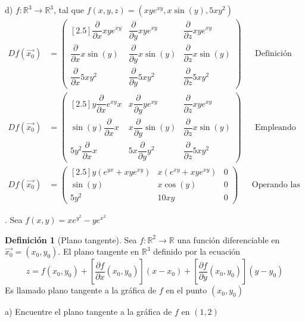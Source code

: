 \documentclass[letterpaper]{article}
\renewcommand{\d}{\partial}
\newcommand{\R}{\mathds{R}}
\renewcommand{\*}{\cdot}
\theoremstyle{definition}
\newtheorem{definition}{Definición}
\begin{document}
\noindent d) $f: \mathbb{R}^3  \longrightarrow \mathbb{R}^3$, tal que $f(x,y,z) = (xye^{xy}, x\sin(y), 5xy^2)$
\begin{align*}
	Df(\vec{x_0}) &= \begin{pmatrix}[2.5]
	\dfrac{\d }{\d x} xye^{xy}  & \dfrac{\d }{\d y} xye^{xy}  & \dfrac{\d }{\d z} xye^{xy} \\
	\dfrac{\d }{\d x} x\sin(y) & \dfrac{\d }{\d y} x\sin(y) & \dfrac{\d }{\d z} x\sin(y) \\
	\dfrac{\d }{\d x}  5xy^2 & \dfrac{\d }{\d y}  5xy^2 & \dfrac{\d }{\d z}  5xy^2 
	\end{pmatrix} && \text{Definición de matriz de derivadas parciales}\\
	Df(\vec{x_0}) &= \begin{pmatrix}[2.5]
	y\dfrac{\d }{\d x} e^{xy}x  & x\dfrac{\d }{\d y} ye^{xy}  & \dfrac{\d }{\d z} xye^{xy} \\
	\sin(y)\dfrac{\d }{\d x} x & x\dfrac{\d }{\d y} \sin(y) & \dfrac{\d }{\d z} x\sin(y) \\
	5y^2\dfrac{\d }{\d x}  x & 5x\dfrac{\d }{\d y}  y^2 & \dfrac{\d }{\d z}  5xy^2 
	\end{pmatrix} && \text{Empleando que la derivada es operador lineal}
\end{align*}
\begin{align*}
	Df(\vec{x_0}) &= \begin{pmatrix}[2.5]
	y(e^{yx} + xye^{xy})  & x(e^{xy} + xye^{xy})  & 0 \\
	\sin(y) & x\cos(y) & 0 \\
	5y^2 & 10xy & 0 
	\end{pmatrix} && \text{Operando las dervidas parciales}
\end{align*}

.  Sea $f(x,y) = xe^{y^2} - ye^{x^2}$\\

\begin{definition}[Plano tangente]
	Sea $ f: \R^2 \to \R $ una función diferenciable en $ \vec{x_0} = (x_0, y_0) $. El plano tangente en $ \R^3 $ definido por la ecuación
	\[ z = f(x_0, y_0) + \left[ \dfrac{\d f}{\d x} (x_0, y_0) \right](x - x_0) + \left[ \dfrac{\d f}{\d y}(x_0, y_0) \right](y-y_0) \]
	Es llamado plano tangente a la gráfica de $ f $ en el punto $ (x_0,y_0) $
\end{definition}
\noindent a) Encuentre el plano tangente a la gráfica de $f$ en $(1, 2)$
\end{document}
